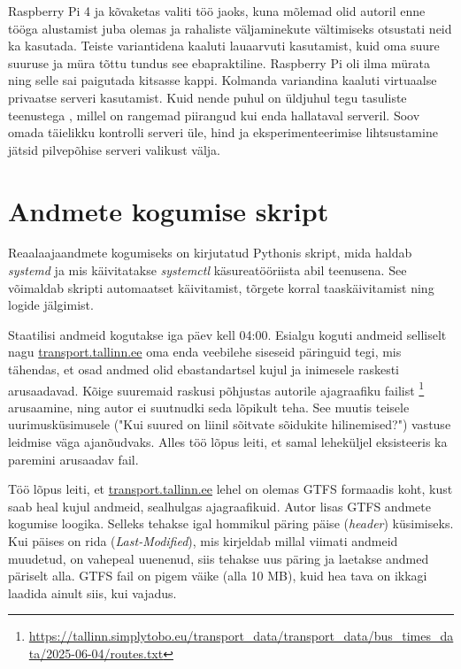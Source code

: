 Raspberry Pi 4 ja kõvaketas valiti töö jaoks, kuna mõlemad olid autoril enne tööga alustamist juba olemas ja rahaliste väljaminekute vältimiseks otsustati neid ka kasutada. Teiste variantidena kaaluti lauaarvuti kasutamist, kuid oma suure suuruse ja müra tõttu tundus see ebapraktiline. Raspberry Pi oli ilma mürata ning selle sai paigutada kitsasse kappi. Kolmanda variandina kaaluti virtuaalse privaatse serveri kasutamist. Kuid nende puhul on üldjuhul tegu tasuliste teenustega \cite{Hetzner2025}, millel on rangemad piirangud kui enda hallataval serveril. Soov omada täielikku kontrolli serveri üle, hind ja eksperimenteerimise lihtsustamine jätsid pilvepõhise serveri valikust välja.



\section{Andmete kogumise skript} %
Reaalaajaandmete kogumiseks on kirjutatud Pythonis skript, mida haldab \textit{systemd} ja mis käivitatakse \textit{systemctl} käsureatööriista abil teenusena. See võimaldab skripti automaatset käivitamist, tõrgete korral taaskäivitamist ning logide jälgimist.

Staatilisi andmeid kogutakse iga päev kell 04:00. Esialgu koguti andmeid selliselt nagu \url{transport.tallinn.ee} oma enda veebilehe siseseid päringuid tegi, mis tähendas, et osad andmed olid ebastandartsel kujul ja inimesele raskesti arusaadavad. Kõige suuremaid raskusi põhjustas autorile ajagraafiku failist \footnote{\url{https://tallinn.simplytobo.eu/transport_data/transport_data/bus_times_data/2025-06-04/routes.txt}} arusaamine, ning autor ei suutnudki seda lõpikult teha. See muutis teisele uurimusküsimusele ("Kui suured on liinil sõitvate sõidukite hilinemised?") vastuse leidmise väga ajanõudvaks. Alles töö lõpus leiti, et samal leheküljel eksisteeris ka paremini arusaadav fail.
 
Töö lõpus leiti, et \url{transport.tallinn.ee} lehel on olemas GTFS formaadis koht, kust saab heal kujul andmeid, sealhulgas ajagraafikuid. Autor lisas GTFS andmete kogumise loogika.  Selleks tehakse igal hommikul päring päise (\textit{header}) küsimiseks. Kui päises on rida (\textit{Last-Modified}), mis kirjeldab millal viimati andmeid muudetud, on vahepeal uuenenud, siis tehakse uus päring ja laetakse andmed päriselt alla. GTFS fail on  pigem väike (alla 10 MB), kuid hea tava on ikkagi laadida ainult siis, kui vajadus.

